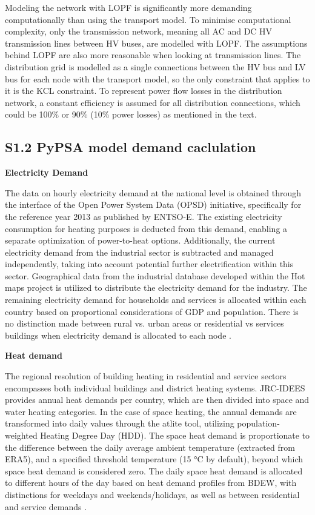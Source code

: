 	Modeling the network with LOPF is significantly more demanding computationally than using the transport model. To minimise computational complexity, only the transmission network, meaning all AC and DC HV transmission lines between HV buses, are modelled with LOPF. The assumptions behind LOPF are also more reasonable when looking at transmission lines. The distribution grid is modelled as a single connections between the HV bus and LV bus for each node with the transport model, so the only constraint that applies to it is the KCL constraint. To represent power flow losses in the distribution network, a constant efficiency is assumed for all distribution connections, which could be 100\% or 90\% (10\% power losses) as mentioned in the text. 
	
	\subsection*{S1.2 PyPSA model demand caclulation}
	
	\textbf{Electricity Demand}
	
	The data on hourly electricity demand at the national level is obtained through the interface of the Open Power System Data (OPSD) initiative, specifically for the reference year 2013 as published by ENTSO-E. The existing electricity consumption for heating purposes is deducted from this demand, enabling a separate optimization of power-to-heat options. Additionally, the current electricity demand from the industrial sector is subtracted and managed independently, taking into account potential further electrification within this sector. Geographical data from the industrial database developed within the Hot maps project is utilized to distribute the electricity demand for the industry. The remaining electricity demand for households and services is allocated within each country based on proportional considerations of GDP and population. There is no distinction made between rural vs. urban areas or residential vs services buildings when electricity demand is allocated to each node .
	
	\textbf{Heat demand}
	
	The regional resolution of building heating in residential and service sectors encompasses both individual buildings and district heating systems. JRC-IDEES provides annual heat demands per country, which are then divided into space and water heating categories. In the case of space heating, the annual demands are transformed into daily values through the atlite tool, utilizing population-weighted Heating Degree Day (HDD). The space heat demand is proportionate to the difference between the daily average ambient temperature (extracted from ERA5), and a specified threshold temperature (15 °C by default), beyond which space heat demand is considered zero. The daily space heat demand is allocated to different hours of the day based on heat demand profiles from BDEW, with distinctions for weekdays and weekends/holidays, as well as between residential and service demands . 
	
